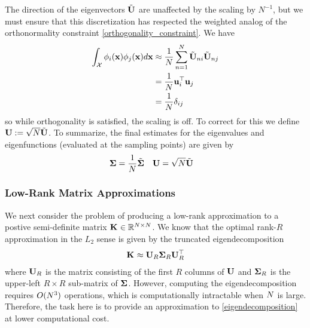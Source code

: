 \documentclass[12pt]{article}
\begin{document}
The direction of the eigenvectors $\tilde{\mathbf{U}}$ are unaffected by the scaling by $N^{-1}$, but we must ensure that this discretization has respected the weighted analog of the orthonormality constraint 
\ref{orthogonality_constraint}. We have 
\begin{align}
\int_{\mathcal{X}} \phi_i(\mathbf{x}) \phi_j(\mathbf{x}) d\mathbf{x} &\approx \frac{1}{N} \sum_{n = 1}^{N} \tilde{\mathbf{U}}_{n i} \tilde{\mathbf{U}}_{n j} \\
								   &= \frac{1}{N} \mathbf{u}_i^\top \mathbf{u}_j \\
								   &= \frac{1}{N} \delta_{ij}
\end{align}
so while orthogonality is satisfied, the scaling is off. To correct for this we define $\mathbf{U} := \sqrt{N} \tilde{\mathbf{U}}$. To summarize, the final estimates for the eigenvalues and 
eigenfunctions (evaluated at the sampling points) are given by 
\begin{align}
&\boldsymbol{\Sigma} = \frac{1}{N} \tilde{\boldsymbol{\Sigma}}  &&\mathbf{U} = \sqrt{N} \tilde{\mathbf{U}}
\end{align}

\subsubsection{Low-Rank Matrix Approximations}
We next consider the problem of producing a low-rank approximation to a postive semi-definite matrix $\mathbf{K}_{} \in \mathbb{R}^{N \times N}$. 
We know that the optimal rank-$R$ approximation in the 
$L_2$ sense is given by the truncated eigendecomposition 
\begin{align}
\mathbf{K}_{} \approx \mathbf{U}_{R} \boldsymbol{\Sigma}_R \mathbf{U}_R^\top \label{eigendecomposition}
\end{align}
where $\mathbf{U}_R$ is the matrix consisting of the first $R$ columns of $\mathbf{U}$ and $\boldsymbol{\Sigma}_R$ is the upper-left $R \times R$ sub-matrix of $\boldsymbol{\Sigma}$. However, computing the 
eigendecomposition requires $O(N^3)$ operations, which is computationally intractable when $N$ is large. Therefore, the task here is to provide an 
approximation to \ref{eigendecomposition} at lower computational cost. 
\end{document}

